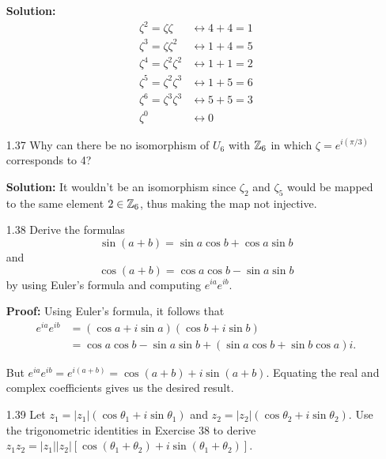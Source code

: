 \begin{enumerate}
      \textbf{Solution:}
      \begin{align*}
         \zeta^2 = \zeta\zeta &\leftrightarrow 4 + 4 = 1 \\
         \zeta^3 = \zeta\zeta^2 &\leftrightarrow 1 + 4 = 5 \\
         \zeta^4 = \zeta ^2\zeta^2 &\leftrightarrow 1 + 1 = 2 \\
         \zeta^5 = \zeta ^2\zeta^3 &\leftrightarrow 1 + 5 = 6 \\
         \zeta^6 = \zeta ^3\zeta^3 &\leftrightarrow 5 + 5 = 3 \\
         \zeta^0 &\leftrightarrow 0
      \end{align*}
   \item[1.37] Why can there be no isomorphism of $U_6$ with $\mathbb{Z}_6$ in which
               $\zeta = e^{i(\pi/3)}$ corresponds to 4?

      \textbf{Solution:} It wouldn't be an isomorphism since $\zeta_2$ and
      $\zeta_5$ would be mapped to the same element $2 \in \mathbb{Z}_6$, thus making
      the map not injective.
   \item[1.38] Derive the formulas
               $$\sin(a + b) = \sin a \cos b + \cos a \sin b$$
               and
               $$\cos(a + b) = \cos a \cos b - \sin a \sin b$$
               by using Euler's formula and computing $e^{ia}e^{ib}$.

      \textbf{Proof:} Using Euler's formula, it follows that
      \begin{align*}
         e^{ia}e^{ib} &= (\cos a + i \sin a)(\cos b + i \sin b) \\
            &= \cos a\cos b - \sin a\sin b + (\sin a\cos b + \sin b\cos a)i.
      \end{align*}

      But $e^{ia}e^{ib} = e^{i(a+b)} = \cos(a + b) + i\sin(a + b)$. Equating
      the real and complex coefficients gives us the desired result.
      
   \item[1.39] Let $z_1 = |z_1|(\cos\theta_1 + i\sin\theta_1)$ and
               $z_2 = |z_2|(\cos\theta_2 + i\sin\theta_2)$. Use the 
               trigonometric identities in Exercise 38 to derive
               $z_1z_2 = |z_1||z_2|[\cos(\theta_1 + \theta_2) +
                i\sin(\theta_1 + \theta_2)]$.


\end{enumerate}
